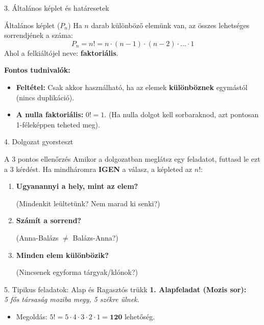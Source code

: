 \documentclass{beamer}
\begin{document}
\begin{frame}{3. Általános képlet és határesetek}
    \begin{block}{Általános képlet ($P_n$)}
        Ha $n$ darab különböző elemünk van, az összes lehetséges sorrendjének a száma:
        $$P_n = n! = n \cdot (n - 1) \cdot (n - 2) \cdot \dots \cdot 1$$
        Ahol a felkiáltójel neve: \textbf{faktoriális}.
    \end{block}

    \vspace{0.3cm}
    \textbf{Fontos tudnivalók:}
    \begin{itemize}
        \item \textbf{Feltétel:} Csak akkor használható, ha az elemek \textbf{különböznek} egymástól (nincs duplikáció).
        \item \textbf{A nulla faktoriális:} $0! = 1$. (Ha nulla dolgot kell sorbaraknod, azt pontosan 1-féleképpen teheted meg).
    \end{itemize}
\end{frame}

\begin{frame}{4. Dolgozat gyorsteszt}
    \begin{alertblock}{A 3 pontos ellenőrzés}
        Amikor a dolgozatban meglátsz egy feladatot, futtasd le ezt a 3 kérdést. Ha mindháromra \textbf{IGEN} a válasz, a képleted az $n!$:
    \end{alertblock}

    \begin{enumerate}
        \item \textbf{Ugyanannyi a hely, mint az elem?} \par (Mindenkit leültetünk? Nem marad ki senki?)
        \item \textbf{Számít a sorrend?} \par (Anna-Balázs $\neq$ Balázs-Anna?)
        \item \textbf{Minden elem különbözik?} \par (Nincsenek egyforma tárgyak/klónok?)
    \end{enumerate}
\end{frame}

\begin{frame}{5. Tipikus feladatok: Alap és Ragasztós trükk}
    \small
    \textbf{1. Alapfeladat (Mozis sor):} \\
    \emph{5 fős társaság moziba megy, 5 székre ülnek.}
    \begin{itemize}
        \item Megoldás: $5! = 5 \cdot 4 \cdot 3 \cdot 2 \cdot 1 = \mathbf{120}$ lehetőség.
    \end{itemize}
\end{frame}
\end{document}
